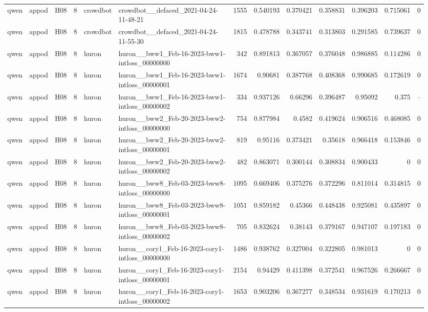 \begin{longtable}{lllrllrrrrrrr}
qwen & appod & H08 & 8 & crowdbot & crowdbot\_\_defaced\_2021-04-24-11-48-21 & 1555 & 0.540193 & 0.370421 & 0.358831 & 0.396203 & 0.715061 & 0 \\
qwen & appod & H08 & 8 & crowdbot & crowdbot\_\_defaced\_2021-04-24-11-55-30 & 1815 & 0.478788 & 0.343741 & 0.313803 & 0.291585 & 0.739637 & 0 \\
qwen & appod & H08 & 8 & huron & huron\_\_bww1\_Feb-16-2023-bww1-intloss\_00000000 & 342 & 0.891813 & 0.367057 & 0.376048 & 0.986885 & 0.114286 & 0 \\
qwen & appod & H08 & 8 & huron & huron\_\_bww1\_Feb-16-2023-bww1-intloss\_00000001 & 1674 & 0.90681 & 0.387768 & 0.408368 & 0.990685 & 0.172619 & 0 \\
qwen & appod & H08 & 8 & huron & huron\_\_bww1\_Feb-16-2023-bww1-intloss\_00000002 & 334 & 0.937126 & 0.66296 & 0.396487 & 0.95092 & 0.375 & -- \\
qwen & appod & H08 & 8 & huron & huron\_\_bww2\_Feb-20-2023-bww2-intloss\_00000000 & 754 & 0.877984 & 0.4582 & 0.419624 & 0.906516 & 0.468085 & 0 \\
qwen & appod & H08 & 8 & huron & huron\_\_bww2\_Feb-20-2023-bww2-intloss\_00000001 & 819 & 0.95116 & 0.373421 & 0.35618 & 0.966418 & 0.153846 & 0 \\
qwen & appod & H08 & 8 & huron & huron\_\_bww2\_Feb-20-2023-bww2-intloss\_00000002 & 482 & 0.863071 & 0.300144 & 0.308834 & 0.900433 & 0 & 0 \\
qwen & appod & H08 & 8 & huron & huron\_\_bww8\_Feb-03-2023-bww8-intloss\_00000000 & 1095 & 0.669406 & 0.375276 & 0.372296 & 0.811014 & 0.314815 & 0 \\
qwen & appod & H08 & 8 & huron & huron\_\_bww8\_Feb-03-2023-bww8-intloss\_00000001 & 1051 & 0.859182 & 0.45366 & 0.448438 & 0.925081 & 0.435897 & 0 \\
qwen & appod & H08 & 8 & huron & huron\_\_bww8\_Feb-03-2023-bww8-intloss\_00000002 & 705 & 0.832624 & 0.38143 & 0.379167 & 0.947107 & 0.197183 & 0 \\
qwen & appod & H08 & 8 & huron & huron\_\_cory1\_Feb-16-2023-cory1-intloss\_00000000 & 1486 & 0.938762 & 0.327004 & 0.322805 & 0.981013 & 0 & 0 \\
qwen & appod & H08 & 8 & huron & huron\_\_cory1\_Feb-16-2023-cory1-intloss\_00000001 & 2154 & 0.94429 & 0.411398 & 0.372541 & 0.967526 & 0.266667 & 0 \\
qwen & appod & H08 & 8 & huron & huron\_\_cory1\_Feb-16-2023-cory1-intloss\_00000002 & 1653 & 0.903206 & 0.367277 & 0.348534 & 0.931619 & 0.170213 & 0 \\

\end{longtable}
